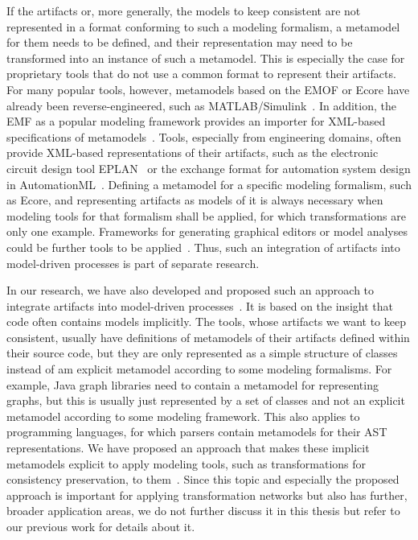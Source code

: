 If the artifacts or, more generally, the models to keep consistent are not represented in a format conforming to such a modeling formalism, a metamodel for them needs to be defined, and their representation may need to be transformed into an instance of such a metamodel.
This is especially the case for proprietary tools that do not use a common format to represent their artifacts.
For many popular tools, however, metamodels based on the \gls{EMOF} or Ecore have already been reverse-engineered, such as 
MATLAB/Simulink~\cite{heinzemann2013Reconfiguration-CBSE,son2012Simulink-CAGGIE,armengaud2011Safety-WCE}.
In addition, the \gls{EMF} as a popular modeling framework provides an importer for \gls{XML}-based specifications of metamodels~\cite[pp.~86]{steinberg2009emf}.
Tools, especially from engineering domains, often provide \gls{XML}-based representations of their artifacts, such as the electronic circuit design tool EPLAN~\cite{eplan} or the exchange format for automation system design in AutomationML~\cite{automationML}.
Defining a metamodel for a specific modeling formalism, such as Ecore, and representing artifacts as models of it is always necessary when modeling tools for that formalism shall be applied, for which transformations are only one example.
Frameworks for generating graphical editors or model analyses could be further tools to be applied~.
Thus, such an integration of artifacts into model-driven processes is part of separate research.

In our research, we have also developed and proposed such an approach to integrate artifacts into model-driven processes~.
It is based on the insight that code often contains models implicitly.
The tools, whose artifacts we want to keep consistent, usually have definitions of metamodels of their artifacts defined within their source code, but they are only represented as a simple structure of classes instead of am explicit metamodel according to some modeling formalisms.
For example, Java graph libraries need to contain a metamodel for representing graphs, but this is usually just represented by a set of classes and not an explicit metamodel according to some modeling framework.
This also applies to programming languages, for which parsers contain metamodels for their \gls{AST} representations.
We have proposed an approach that makes these implicit metamodels explicit to apply modeling tools, such as transformations for consistency preservation, to them~.
Since this topic and especially the proposed approach is important for applying transformation networks but also has further, broader application areas, we do not further discuss it in this thesis but refer to our previous work for details about it.


